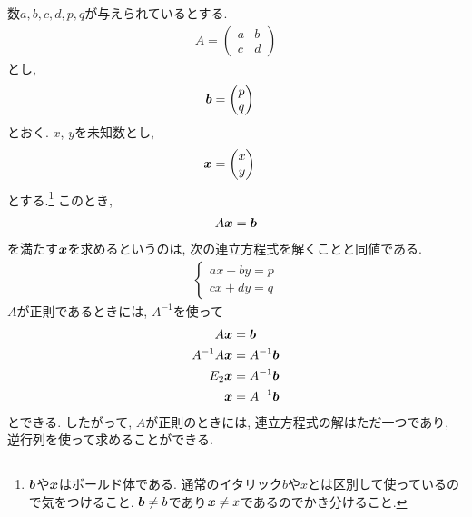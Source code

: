 \begin{remark}
  \label{ex:sle:regcase}
  数$a,b,c,d,p,q$が与えられているとする.
  \begin{align*}
    A=
  \begin{pmatrix}
    a&b\\c&d
  \end{pmatrix}
  \end{align*}
  とし,
  \begin{align*}
      \boldsymbol{b}&=
  \begin{pmatrix}
    p\\q
  \end{pmatrix}  
  \end{align*}
  とおく.
  $x$, $y$を未知数とし,
  \begin{align*}
    \boldsymbol{x}&=
  \begin{pmatrix}
    x\\y
  \end{pmatrix}
  \end{align*}
  とする.\footnote{$\boldsymbol{b}$や$\boldsymbol{x}$はボールド体である.  通常のイタリック$b$や$x$とは区別して使っているので気をつけること.   $\boldsymbol{b}\neq b$であり$\boldsymbol{x}\neq x$であるのでかき分けること.}
  このとき,
  \begin{align*}
    A\boldsymbol{x}=\boldsymbol{b}
  \end{align*}
  を満たす$\boldsymbol{x}$を求めるというのは,
  次の連立方程式を解くことと同値である.
  \begin{align*}
    \begin{cases}
      ax+by=p\\
      cx+dy=q
    \end{cases}
  \end{align*}
  $A$が正則であるときには, $A^{-1}$を使って
  \begin{align*}
    A\boldsymbol{x}&=\boldsymbol{b}\\
    A^{-1}A\boldsymbol{x}&=A^{-1}\boldsymbol{b}\\
    E_2\boldsymbol{x}&=A^{-1}\boldsymbol{b}\\
    \boldsymbol{x}&=A^{-1}\boldsymbol{b}
  \end{align*}
  とできる.
  したがって,
  $A$が正則のときには, 連立方程式の解はただ一つであり,
  逆行列を使って求めることができる.
\end{remark}
